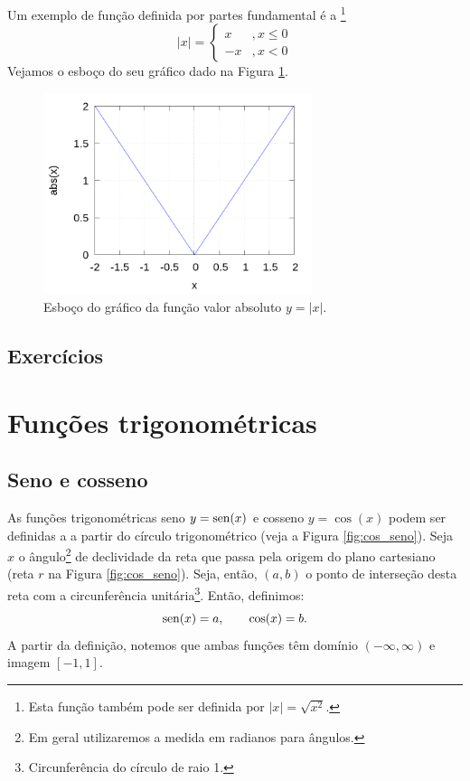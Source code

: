 Um exemplo de função definida por partes fundamental é a \footnote{Esta função também pode ser definida por $|x| = \sqrt{x^2}$.}
\begin{equation}
  |x| = \left\{
    \begin{array}{ll}
      x &, x\leq 0\\
      -x &, x<0
    \end{array}
\right.
\end{equation}
Vejamos o esboço do seu gráfico dado na Figura \ref{fig:funabs}.

\begin{figure}[H]
  \centering
  \includegraphics[width=0.7\textwidth]{./cap_funcao/dados/fig_funabs/fig_funabs}
  \caption{Esboço do gráfico da função valor absoluto $y=|x|$.}
  \label{fig:funabs}
\end{figure}

\subsection*{Exercícios}

\emconstrucao

\section{Funções trigonométricas}\label{cap_funcao_sec_funtri}

\subsection{Seno e cosseno}

As funções trigonométricas seno $y=\operatorname{sen}(x)$ e cosseno $y=\cos(x)$ podem ser definidas a a partir do círculo trigonométrico (veja a Figura \ref{fig:cos_seno}). Seja $x$ o ângulo\footnote{Em geral utilizaremos a medida em radianos para ângulos.} de declividade da reta que passa pela origem do plano cartesiano (reta $r$ na Figura \ref{fig:cos_seno}). Seja, então, $(a,b)$ o ponto de interseção desta reta com a circunferência unitária\footnote{Circunferência do círculo de raio 1.}. Então, definimos:
\begin{equation}
  \operatorname{sen}(x) = a,\qquad \cos(x) = b.
\end{equation}
A partir da definição, notemos que ambas funções têm domínio $(-\infty, \infty)$ e imagem $[-1, 1]$.


